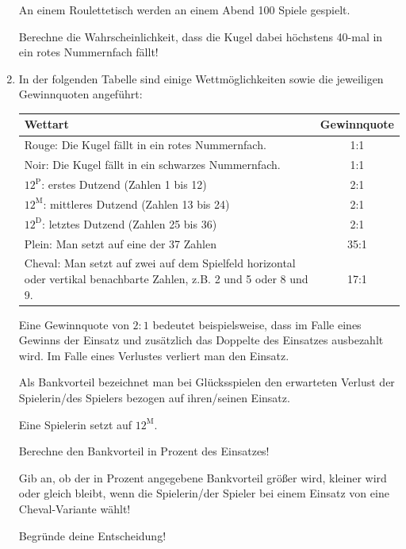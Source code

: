 \begin{langesbeispiel}
\begin{enumerate}
	An einem Roulettetisch werden an einem Abend 100 Spiele gespielt.
	
	 Berechne die Wahrscheinlichkeit, dass die Kugel dabei höchstens 40-mal in ein rotes Nummernfach fällt!\leer
	
	\item In der folgenden Tabelle sind einige Wettmöglichkeiten sowie die jeweiligen Gewinnquoten angeführt:\leer
	
	\begin{tabular}{|l|c|}\hline
	\cellcolor[gray]{0.9}Wettart&\cellcolor[gray]{0.9}Gewinnquote\\ \hline
	Rouge: Die Kugel fällt in ein rotes Nummernfach.&1:1\\ \hline
	Noir: Die Kugel fällt in ein schwarzes Nummernfach.&1:1\\ \hline
	$12^\text{P}$: erstes Dutzend (Zahlen 1 bis 12)&2:1\\ \hline
	$12^\text{M}$: mittleres Dutzend (Zahlen 13 bis 24)&2:1\\ \hline
	$12^\text{D}$: letztes Dutzend (Zahlen 25 bis 36)&2:1\\ \hline
	Plein: Man setzt auf eine der 37 Zahlen&35:1\\ \hline
	\multicolumn{1}{|p{10cm}|}{Cheval: Man setzt auf zwei auf dem Spielfeld horizontal oder vertikal benachbarte Zahlen, z.B. 2 und 5 oder 8 und 9.}&17:1\\ \hline	
	\end{tabular}\leer
	
 Eine Gewinnquote von $2:1$ bedeutet beispielsweise, dass im Falle eines Gewinns der Einsatz und zusätzlich das Doppelte des Einsatzes ausbezahlt wird. Im Falle eines Verlustes verliert man den Einsatz.

 Als Bankvorteil bezeichnet man bei Glücksspielen den erwarteten Verlust der Spielerin/des Spielers bezogen auf ihren/seinen Einsatz.

Eine Spielerin setzt  auf $12^\text{M}$. 

Berechne den Bankvorteil in Prozent des Einsatzes! 
 
Gib an, ob der in Prozent angegebene Bankvorteil größer wird, kleiner wird oder gleich bleibt, wenn die Spielerin/der Spieler bei einem Einsatz von  eine Cheval-Variante wählt!  

Begründe deine Entscheidung!


	
\end{enumerate}
\end{langesbeispiel}
